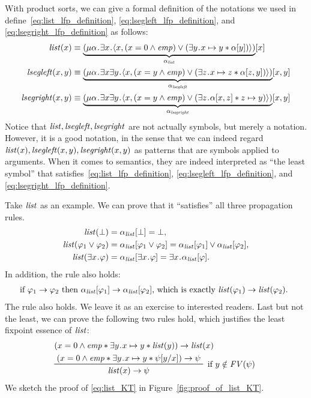 \documentclass{amsart}
\begin{document}
With product sorts, we can
give a formal definition of the notations we used in
define~\eqref{eq:list_lfp_definition}, \eqref{eq:lsegleft_lfp_definition},
and \eqref{eq:lsegright_lfp_definition} as follows:
\begin{align}
\label{eq:three_SL_notations}
\listit(x) &\equiv 
\underbrace{( \mu \alpha \ldot \exists x \ldot \la x , 
(x = 0 \wedge \emp) \vee (\exists y \ldot x \mapsto y \merge \alpha[y] )
\ra
)
}_{\alpha_\listit}
[x] \\
\lsegleft(x,y) &\equiv 
\underbrace{( \mu \alpha \ldot 	\exists x  \exists y \ldot \la x , 
( x = y \wedge \emp) \vee 
(\exists z \ldot x \mapsto z \merge \alpha[z,y] )
\ra
)
}_{\alpha_\lsegleft}
[x,y] \\
\lsegright(x,y) &\equiv 
\underbrace{( \mu \alpha \ldot \exists x  \exists y \ldot \la x ,
(x = y \wedge \emp) \vee (\exists z \ldot \alpha[x,z] \merge z \mapsto y )
\ra
)
}_{\alpha_\lsegright}
[x,y]
\end{align}
Notice that $\mathit{list},\mathit{ls\hspace{-0.02em}e\hspace{-0.04em}gleft},\mathit{ls\hspace{-0.02em}e\hspace{-0.04em}gright}$ are not actually symbols,
but merely a notation.
However, it is a good notation, in the sense that 
we can indeed regard 
$\mathit{list}(x), \mathit{ls\hspace{-0.02em}e\hspace{-0.04em}gleft}(x,y),\mathit{ls\hspace{-0.02em}e\hspace{-0.04em}gright}(x,y)$ 
as patterns that are symbols applied to arguments.
When it comes to semantics, they are 
indeed interpreted as ``the least symbol''
that satisfies~\eqref{eq:list_lfp_definition}, 
\eqref{eq:lsegleft_lfp_definition},
and \eqref{eq:lsegright_lfp_definition}.

Take $\mathit{list}$ as an example. We can prove that
it ``satisfies'' all three propagation rules.
\begin{align}
\mathit{list}(\bot) &= \alpha_{\mathit{list}}[\bot] = \bot,
\\
\mathit{list}(\varphi_1 \vee \varphi_2) &= \alpha_{\mathit{list}}[\varphi_1 \vee \varphi_2]
= \alpha_{\mathit{list}}[\varphi_1] \vee \alpha_{\mathit{list}}[\varphi_2],
\\
\mathit{list}(\exists x \mathbin{\!.\!} \varphi) &=
\alpha_{\mathit{list}}[\exists x \mathbin{\!.\!} \varphi] =
\exists x \mathbin{\!.\!} \alpha_{\mathit{list}}[\varphi].
\end{align}
In addition, the  rule also holds:
\begin{align}
\text{if $\varphi_1 \to \varphi_2$ then
$\alpha_{\mathit{list}}[\varphi_1] \to \alpha_{\mathit{list}}[\varphi_2]$,
which is exactly
$\mathit{list}(\varphi_1) \to \mathit{list}(\varphi_2)$.
}
\end{align}
The  rule also holds.
We leave it as an exercise to interested readers.
Last but not the least, we can prove the following two rules hold,
which justifies the least fixpoint essence of $\mathit{list}$:
\begin{align}
\label{eq:list_fixpoint}
&(x = 0 \wedge \emp \merge \exists y \ldot x \mapsto y \merge \listit(y)) 
\imp \listit(x)
\\
\label{eq:list_KT}
&\prftree[r]
{ %
if $y \notin \FV(\psi)$
}
{
(x = 0 \wedge \emp \merge \exists y \ldot x \mapsto y \merge \psi[y/x]) 
\to \psi
}{
\listit(x) \to \psi
}
\end{align}
We sketch the proof of \eqref{eq:list_KT} in Figure~\ref{fig:proof_of_list_KT}.
\end{document}

